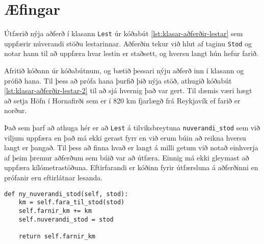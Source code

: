 

\newpage
\section{Æfingar}
\begin{exercise}\label{kla1}
Útfærið nýja aðferð í klasann \texttt{Lest} úr kóðabút \ref{lst:klasar-aðferðir-lestar} sem uppfærir núverandi stöðu lestarinnar.
Aðferðin tekur við hlut af taginu \texttt{Stod} og notar hann til að uppfæra hvar lestin er staðsett, og hversu langt hún hefur farið.

Afritið kóðann úr kóðabútnum, og bætið þessari nýju aðferð inn í klasann og prófið hana.
Til þess að prófa hana þurfið þið nýja stöð, athugið kóðabút \ref{lst:klasar-aðferðir-lestar-2} til að sjá hvernig það var gert.
Til dæmis væri hægt að setja Höfn í Hornafirði sem er í 820 km fjarlægð frá Reykjavík ef farið er norður.
\end{exercise}
\begin{Answer}[ref={kla1}]
Það sem þarf að athuga hér er að \texttt{Lest} á tilviksbreytuna \texttt{nuverandi\_stod} sem við viljum uppfæra en það má ekki gerast fyrr en við erum búin að reikna hversu langt er þangað.
Til þess að finna hvað er langt á milli getum við notað einhverja af þeim þremur aðferðum sem búið var að útfæra.
Einnig má ekki gleymast að uppfæra kílómetrastöðuna.
Eftirfarandi er kóðinn fyrir útfærsluna á aðferðinni en prófanir eru eftirlátnar lesanda.
	\begin{lstlisting}
def ny_nuverandi_stod(self, stod):
	km = self.fara_til_stod(stod)
	self.farnir_km += km
	self.nuverandi_stod = stod

	return self.farnir_km\end{lstlisting}
\end{Answer}

